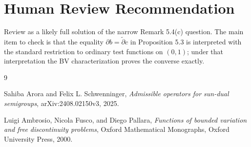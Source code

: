 \documentclass[11pt]{article}
\newcommand{\widpartial}{\widetilde{\partial}}
\begin{document}
\section*{Human Review Recommendation}

Review as a likely full solution of the narrow Remark 5.4(c) question.  The main item to check is that the equality $\partial b=\widpartial c$ in Proposition 5.3 is interpreted with the standard restriction to ordinary test functions on $(0,1)$; under that interpretation the BV characterization proves the converse exactly.

\begin{thebibliography}{9}

Sahiba Arora and Felix L. Schwenninger,
\emph{Admissible operators for sun-dual semigroups},
arXiv:2408.02150v3, 2025.

Luigi Ambrosio, Nicola Fusco, and Diego Pallara,
\emph{Functions of bounded variation and free discontinuity problems},
Oxford Mathematical Monographs, Oxford University Press, 2000.

\end{thebibliography}
\end{document}
